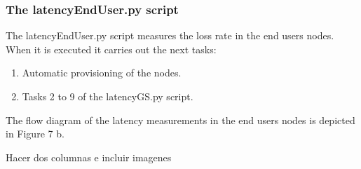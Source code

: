 \subsubsection{The latencyEndUser.py script}

The latencyEndUser.py  script measures the loss rate in the end users
nodes. When it is executed it carries out the next tasks:
\begin{enumerate}
\item Automatic provisioning of the nodes.
\item Tasks 2 to 9 of the latencyGS.py script.
\end{enumerate}

The flow diagram of the latency measurements in the end users nodes is depicted in Figure 7 b.

Hacer dos columnas e incluir imagenes


